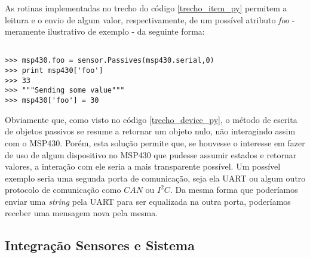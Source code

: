 As rotinas implementadas no trecho do código \ref{trecho_item_py} permitem a leitura e o envio de algum valor, respectivamente, de um possível atributo \textit{foo} - meramente ilustrativo de exemplo - da seguinte forma:

\begin{lstlisting}[frame=none,numbers=none]  % Start your code-block

>>> msp430.foo = sensor.Passives(msp430.serial,0)
>>> print msp430['foo']
>>> 33
>>> """Sending some value"""
>>> msp430['foo'] = 30
\end{lstlisting}

Obviamente que, como visto no código \ref{trecho_device_py}, o método de escrita de objetos passivos se resume a retornar um objeto nulo, não interagindo assim com o MSP430. Porém, esta solução permite que, se houvesse o interesse em fazer de uso de algum dispositivo no MSP430 que pudesse assumir estados e retornar valores, a interação com ele seria a mais transparente possível. Um possível exemplo seria uma segunda porta de comunicação, seja ela UART ou algum outro protocolo de comunicação como $CAN$ ou $I^2C$. Da mesma forma que poderíamos enviar uma \textit{string} pela UART para ser equalizada na outra porta, poderíamos receber uma mensagem nova pela mesma.



\subsection{Integração Sensores e Sistema}
